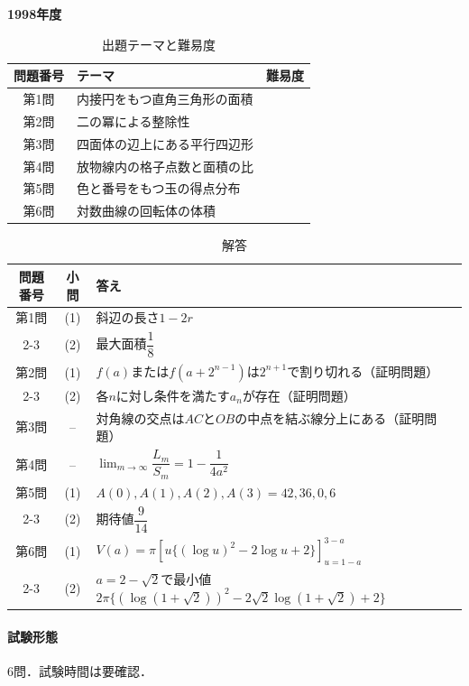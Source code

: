 \documentclass[../../main.tex]{subfiles}
\begin{document}
\begin{center}
  {\fontsize{48pt}{58pt}\selectfont \textbf{1998}\normalsize\textbf{年度}}
\end{center}

\begin{table}[htb]
  \centering
  \caption{出題テーマと難易度}
  \begin{tabular}{|c|p{9cm}|c|}
    \hline
    \textbf{問題番号} & \textbf{テーマ} & \textbf{難易度} \\
    \hline
    第1問 & 内接円をもつ直角三角形の面積 & \\
    \hline
    第2問 & 二の冪による整除性 & \\
    \hline
    第3問 & 四面体の辺上にある平行四辺形 & \\
    \hline
    第4問 & 放物線内の格子点数と面積の比 & \\
    \hline
    第5問 & 色と番号をもつ玉の得点分布 & \\
    \hline
    第6問 & 対数曲線の回転体の体積 & \\
    \hline
  \end{tabular}
\end{table}

\begin{table}[htb]
  \centering
  \caption{解答}
  \renewcommand{\arraystretch}{1.4}
  \begin{tabular}{|c|c|p{9cm}|}
    \hline
    \textbf{問題番号} & \textbf{小問} & \textbf{答え} \\
    \hline
    第1問 & (1) & 斜辺の長さ$1-2r$ \\
    \cline{2-3}
    & (2) & 最大面積$\dfrac{1}{8}$ \\
    \hline
    第2問 & (1) & $f(a)$または$f(a+2^{n-1})$は$2^{n+1}$で割り切れる（証明問題） \\
    \cline{2-3}
    & (2) & 各$n$に対し条件を満たす$a_n$が存在（証明問題） \\
    \hline
    第3問 & -- & 対角線の交点は$AC$と$OB$の中点を結ぶ線分上にある（証明問題） \\
    \hline
    第4問 & -- & $\lim_{m\to\infty}\dfrac{L_m}{S_m}=1-\dfrac{1}{4a^2}$ \\
    \hline
    第5問 & (1) & $A(0),A(1),A(2),A(3)=42,36,0,6$ \\
    \cline{2-3}
    & (2) & 期待値$\dfrac{9}{14}$ \\
    \hline
    第6問 & (1) & $V(a)=\pi\left[u\{(\log u)^2-2\log u+2\}\right]_{u=1-a}^{3-a}$ \\
    \cline{2-3}
    & (2) & $a=2-\sqrt{2}$で最小値$2\pi\{(\log(1+\sqrt{2}))^2-2\sqrt{2}\log(1+\sqrt{2})+2\}$ \\
    \hline
  \end{tabular}
\end{table}

\paragraph{試験形態}
6問．試験時間は要確認．
\end{document}
